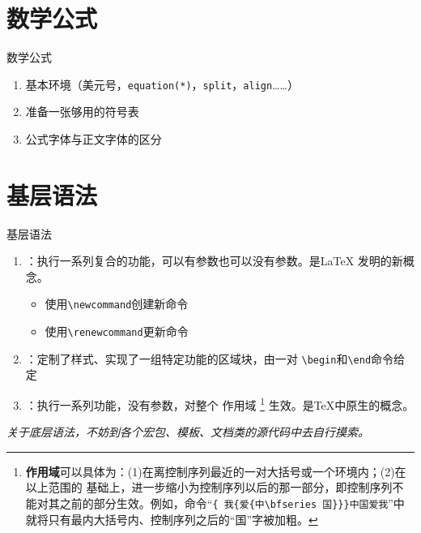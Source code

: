 \documentclass[10pt]{beamer}
\begin{document}
\section{数学公式}
\begin{frame}{数学公式}
\begin{enumerate}
    \item 基本环境（美元号，\texttt{equation(*)}，\texttt{split}，\texttt{align}……）
    \item 准备一张够用的符号表
    \item 公式字体与正文字体的区分
\end{enumerate}
\end{frame}

\section{基层语法}
\begin{frame}{基层语法}
\begin{enumerate}
    \item {}：执行一系列复合的功能，可以有参数也可以没有参数。是\LaTeX
    发明的新概念。
        \begin{itemize}
            \item 使用\texttt{\textbackslash{}newcommand}创建新命令
            \item 使用\texttt{\textbackslash{}renewcommand}更新命令
        \end{itemize}
    \item {}：定制了样式、实现了一组特定功能的区域块，由一对
    \texttt{\textbackslash{}begin}和\texttt{\textbackslash{}end}命令给定
    \item {}：执行一系列功能，没有参数，对整个
    作用域
    \footnote{\textbf{作用域}可以具体为：(1)在离控制序列最近的一对大括号或一个环境内；(2)在以上范围的
    基础上，进一步缩小为控制序列以后的那一部分，即控制序列不能对其之前的部分生效。例如，命令“\texttt{\{
    我\{爱\{中\textbackslash{}bfseries 国\}\}\}中国爱我}”中就将只有最内大括号内、控制序列之后的“国”字被加粗。}
    生效。是\TeX 中原生的概念。
\end{enumerate}

\textit{关于底层语法，不妨到各个宏包、模板、文档类的源代码中去自行摸索。}
\end{frame}

\end{document}
